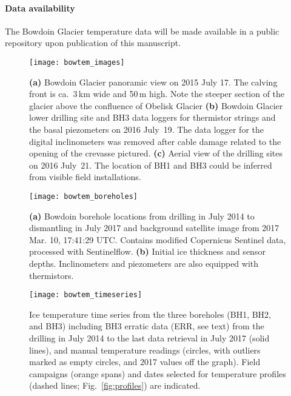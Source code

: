 \documentclass[utf8]{article}
\begin{document}
\paragraph{Data availability}

    The Bowdoin Glacier temperature data will be made available in a public
    repository upon publication of this manuscript.







\clearpage

    \begin{figure}
      \centerline{\texttt{[image: bowtem\_images]}}
      \caption{%
        \textbf{(a)} Bowdoin Glacier panoramic view on 2015 July 17. The
          calving front is ca.~3\,km wide and 50\,m high. Note the steeper
          section of the glacier above the confluence of Obelisk Glacier
        \textbf{(b)} Bowdoin Glacier lower drilling site and BH3 data loggers
          for thermistor strings and the basal piezometers on 2016 July~19. The
          data logger for the digital inclinometers was removed after cable
          damage related to the opening of the crevasse pictured.
        \textbf{(c)} Aerial view of the drilling sites on 2016 July~21. The
          location of BH1 and BH3 could be inferred from visible field
          installations.}
      \label{fig:images}
    \end{figure}

    \begin{figure}
      \centerline{\texttt{[image: bowtem\_boreholes]}}
      \caption{%
        \textbf{(a)} Bowdoin borehole locations from drilling in July 2014 to
          dismantling in July 2017 and background satellite image from 2017
          Mar. 10, 17:41:29 UTC. Contains modified Copernicus Sentinel data,
          processed with Sentinelflow.
        \textbf{(b)} Initial ice thickness and sensor depths. Inclinometers
          and piezometers are also equipped with thermistors.}
      \label{fig:boreholes}
    \end{figure}

    \begin{figure}
      \centerline{\texttt{[image: bowtem\_timeseries]}}
      \caption{%
        Ice temperature time series from the three boreholes (BH1, BH2, and
        BH3) including BH3 erratic data (ERR, see text) from the drilling in
        July 2014 to the last data retrieval
        in July 2017 (solid lines), and manual temperature readings (circles,
        with outliers marked as empty circles, and 2017 values off the graph).
        Field campaigns (orange spans) and dates selected for
        temperature profiles (dashed lines; Fig.~\ref{fig:profiles}) are
        indicated.}
      \label{fig:timeseries}
    \end{figure}
\end{document}
